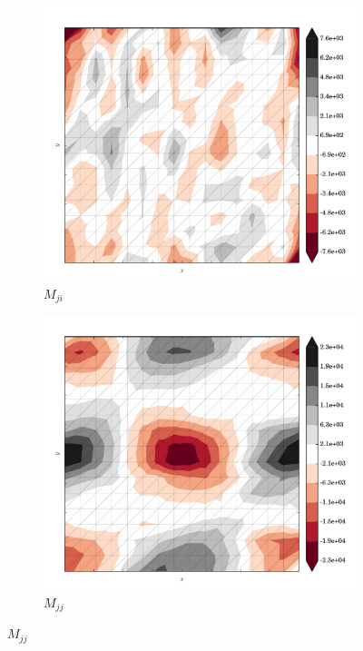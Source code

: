\begin{figure}
  \begin{subfigure}[b]{0.3\linewidth}
    \includegraphics[width=\linewidth]{images/stress_balance/FS/M_ji.pdf}
  \caption{$M_{ji}$}
  \label{fs_M_ji}
  \end{subfigure}
  \begin{subfigure}[b]{0.3\linewidth}
    \includegraphics[width=\linewidth]{images/stress_balance/FS/M_jj.pdf}
  \caption{$M_{jj}$}
  \label{fs_M_jj}
  \end{subfigure}

\end{figure}
